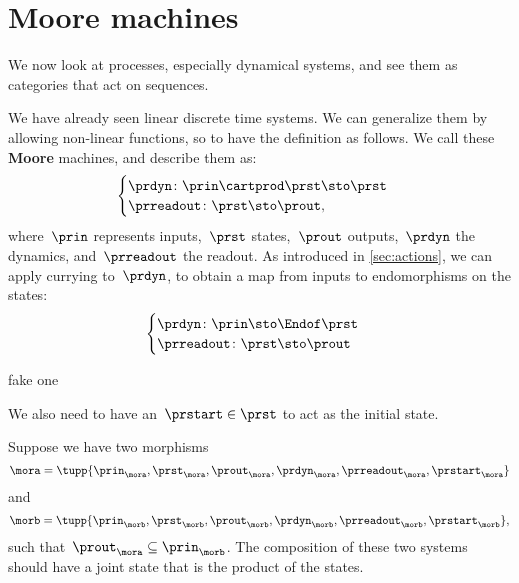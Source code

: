 
\section{Moore machines}


We now look at processes, especially dynamical systems, and see them as categories that act on sequences.

We have already seen linear discrete time systems. We can generalize them by allowing non-linear functions, so to have
the definition as follows. We call these \textbf{Moore} machines, and describe them as:
\begin{equation}\label{eq:moore-1}
    \begin{cases}
    \prdyn \colon \prin \cartprod \prst \sto \prst \\
    \prreadout \colon \prst \sto \prout,
    \end{cases}
\end{equation}
where~$\prin$ represents inputs,~$\prst$ states,~$\prout$ outputs,~$\prdyn$ the dynamics, and~$\prreadout$ the readout.
As introduced in \cref{sec:actions}, we can apply currying to~$\prdyn$, to obtain a map from inputs to endomorphisms on the states:
\begin{equation}\label{eq:moore-1-endo}
  \begin{cases}
  \prdyn \colon \prin \sto \Endof \prst \\
  \prreadout \colon \prst \sto \prout
  \end{cases}
\end{equation}

\begin{exercise}
fake one
\end{exercise}
\begin{solution}
\end{solution}


We also need to have an~$\prstart \in \prst$ to act as the initial state.


Suppose we have two morphisms
\begin{equation}\label{eq:moore-mora}
  \mora = \tupp{\prin_{\mora},\prst_{\mora},\prout_{\mora},\prdyn_{\mora},\prreadout_{\mora},\prstart_{\mora}}
\end{equation}
and
\begin{equation}\label{eq:moore-morb}
\morb = \tupp{\prin_{\morb},\prst_{\morb},\prout_{\morb},\prdyn_{\morb},\prreadout_{\morb},\prstart_{\morb}},
\end{equation}
such that~$\prout_{\mora} \subseteq \prin_{\morb}$. The composition of these two systems should have a joint state that is the product of the states.

